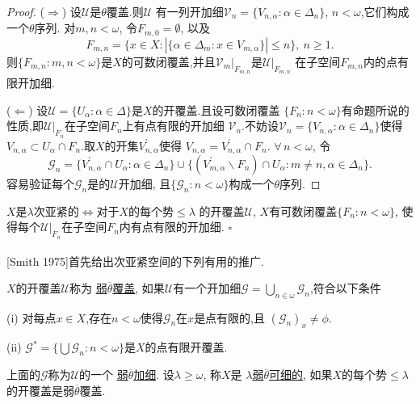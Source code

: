 \documentclass[main.tex]{subfiles}
\begin{document}
\begin{proof}
($\Rightarrow$) 设$\mathscr{U}$是$\theta$覆盖.则$\mathscr{U}$
有一列开加细$\mathscr{V}_n = \{V_{n, \alpha}: \alpha\in \Delta_n\}$,
$n<\omega$,它们构成一个$\theta$序列.
对$m,n<\omega$, 令$F_{m,0} = \emptyset$, 以及
$$F_{m,n}=\{x\in X: |\{\alpha\in\Delta_m: x\in V_{m,\alpha}\}|\le n\}, \: n\ge 1.$$
则$\{F_{m,n}:m,n<\omega\}$是$X$的可数闭覆盖,并且$\mathscr{V}_m|_{F_{m,n}}$是$\mathscr{U}|_{F_{m,n}}$
在子空间$F_{m,n}$内的点有限开加细.

($\Leftarrow$) 设$\mathscr{U} = \{ U_\alpha: \alpha\in\Delta\}$是$X$的开覆盖.且设可数闭覆盖
$\{F_n:n<\omega\}$有命题所说的性质,即$\mathscr{U}|_{F_n}$在子空间$F_n$上有点有限的开加细
$\mathscr{V}_n$.不妨设$\mathscr{V}_n=\{V_{n,\alpha}:\alpha\in\Delta_n\}$使得
$V_{n,\alpha}\subset U_\alpha\cap F_n$.取$X$的开集$V_{n,\alpha}^\prime$使得
$V_{n,\alpha}=V_{n,\alpha}^\prime\cap F_n$. 
$\forall \, n<\omega$, 令
$$\mathscr{G}_n=\{V_{n,\alpha}^\prime\cap U_\alpha:\alpha\in\Delta_n\}
\cup\{(V_{m,\alpha}^\prime\backslash F_n)\cap U_\alpha: m\ne n, \alpha\in\Delta_n\}.$$
容易验证每个$\mathscr{G}_n$是的$\mathscr{U}$开加细,
且$\{\mathscr{G}_n: n<\omega\}$构成一个$\theta$序列. 
\end{proof}

\begin{corollary} \label{cor:2.2.1}
$X$是$\lambda$次亚紧的$\Leftrightarrow$对于$X$的每个势$\le\lambda$
的开覆盖$\mathscr{U}$, $X$有可数闭覆盖$\{F_n: n<\omega\}$,
使得每个$\mathscr{U}|_{F_n}$在子空间$F_n$内有点有限的开加细. $\square$
\end{corollary}

[Smith 1975]\textsuperscript{\cite{Smith1975}}首先给出次亚紧空间的下列有用的推广.

\begin{definition} \label{def:2.3}
$X$的开覆盖$\mathscr{U}$称为
\underline{弱$\overline{\theta}$覆盖},
如果$\mathscr{U}$有一个开加细$\mathscr{G}=\bigcup_{n\in\omega}\mathscr{G}_n$,符合以下条件

(i) 对每点$x\in X$,存在$n<\omega$使得$\mathscr{G}_n$在$x$是点有限的,且
$(\mathscr{G}_n)_x \ne \phi$.

(ii) $\mathscr{G}^* =\{\bigcup \mathscr{G}_n: n<\omega\}$是$X$的点有限开覆盖.

上面的$\mathscr{G}$称为$\mathscr{U}$的一个
\underline{弱$\overline{\theta}$加细}.
设$\lambda\ge\omega$, 称$X$是 
\underline{$\lambda$弱$\overline{\theta}$可细的},
如果$X$的每个势$\le\lambda$的开覆盖是弱$\overline{\theta}$覆盖.
\end{definition}
\end{document}

